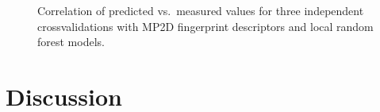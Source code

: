 \documentclass[]{achemso}
\begin{document}
\begin{figure}




\caption{Correlation of predicted vs.~measured values for three
independent crossvalidations with MP2D fingerprint descriptors and local
random forest models.}

\label{fig:cv}

\end{figure}

\section{Discussion}\label{discussion}
\end{document}
